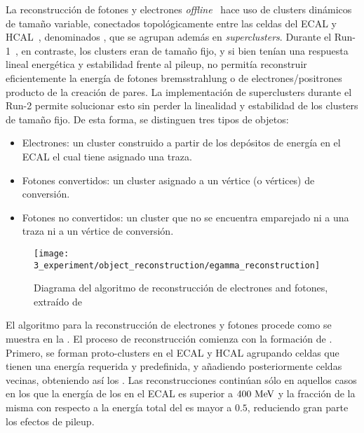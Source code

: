La reconstrucción de fotones y electrones \textit{offline}~\cite{ATLAS-EGamma-Performance-2015-2017,ATLAS-TopoClusters-Run2} hace uso de clusters dinámicos de tamaño variable, conectados topológicamente entre las celdas del \ac{ECAL} y \ac{HCAL}~\cite{ATLAS-TopoClusters-Run1}, denominados \textit{\topos}, que se agrupan adem\'as en \textit{superclusters}. 
Durante el Run-1~\cite{ATLAS-EGamma-Performance-Run1, ATLAS-EGamma-CalibrationPerformance-Run1, ATLAS-CalorimeterClustering-2008}, en contraste, los clusters eran de tama\~no fijo, y si bien ten\'ian una respuesta lineal energ\'etica y estabilidad frente al pileup, no permit\'ia reconstruir eficientemente la energ\'ia de fotones bremsstrahlung o de electrones/positrones producto de la creaci\'on de pares. La implementaci\'on de superclusters durante el Run-2
permite solucionar esto sin perder la linealidad y estabilidad de los clusters de tama\~no fijo.
De esta forma, se distinguen tres tipos de objetos:
\begin{itemize}
    \item Electrones: un cluster construido a partir de los depósitos de energía en el \ac{ECAL} el cual tiene asignado una traza.
    \item Fotones convertidos: un cluster asignado a un vértice (o vértices) de conversión.
    \item Fotones no convertidos: un cluster que no se encuentra emparejado ni a una traza ni a un vértice de conversión.
\end{itemize}

\begin{figure}[ht!]
    \centering
    \texttt{[image: 3\_experiment/object\_reconstruction/egamma\_reconstruction]}
    \caption{Diagrama del algoritmo de reconstrucci\'on de electrones and fotones, extra\'ido de }
    \label{fig:objects:egamma:reco:reco_diagram}
\end{figure}

El algoritmo para la reconstrucción de electrones y fotones procede como se muestra en la \Fig{\ref{fig:objects:egamma:reco:reco_diagram}}.
El proceso de reconstrucción comienza con la formación de \topos. Primero, se forman proto-clusters en el \ac{ECAL} y \ac{HCAL} agrupando celdas que tienen una energ\'ia requerida y predefinida, y añadiendo posteriormente celdas vecinas, obteniendo as\'i los \topos. Las reconstrucciones contin\'uan sólo en aquellos casos en los que la energía de los \topos en el \ac{ECAL} es superior a \(400~\text{MeV}\) y la fracci\'on de la misma con respecto a la energ\'ia total del \topo es mayor a \(0.5\), reduciendo gran parte los efectos de pileup.

